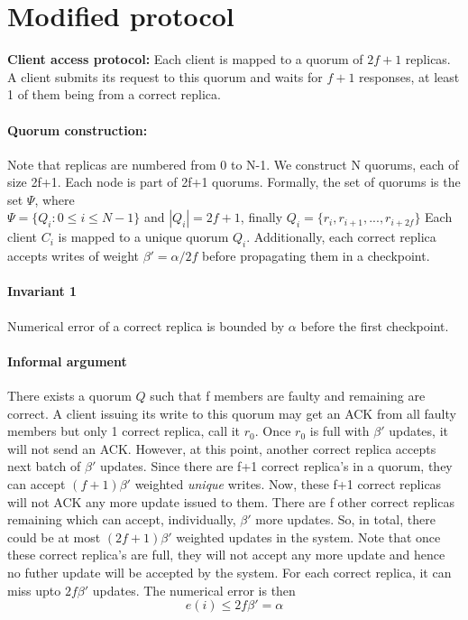 \documentclass[letterpaper,twocolumn,10pt]{article}
\begin{document}
\section{Modified protocol}
\textbf{Client access protocol:} Each client is mapped to a
quorum of $2f+1$ replicas. A client submits its request to
this quorum and waits for $f+1$ responses, at least 1 of 
them being from a correct replica.

\paragraph{Quorum construction:} Note that replicas are numbered
from 0 to N-1. We construct N quorums, each of size 2f+1. Each
node is part of 2f+1 quorums. Formally, the set of quorums is 
the set $\Psi$, where\\
$\Psi = \{Q_{i}:0 \le i \le N-1\}$ and $|Q_{i}| = 2f+1$,
finally $Q_{i}=\{r_{i},r_{i+1},...,r_{i+2f}\}$
Each client $C_{i}$ is mapped to a unique quorum $Q_{i}$.
Additionally, each correct replica accepts writes of 
weight $\beta'=\alpha/2f$ before propagating them in a checkpoint.

\paragraph{Invariant 1} Numerical
error of a correct replica is bounded by $\alpha$ before
the first checkpoint.

\paragraph{Informal argument}
There exists a quorum $Q$ such that f members are faulty
and remaining are correct. A client issuing its write to
this quorum may get an ACK from all faulty members but only
1 correct replica, call it $r_{0}$. Once $r_{0}$ is full
with $\beta'$ updates, it will not send an ACK. However,
at this point, another correct replica accepts next batch
of $\beta'$ updates. Since there are f+1 correct replica's
in a quorum, they can accept $(f+1)\beta'$ weighted 
\textit{unique} writes. Now, these f+1 correct replicas will
not ACK any more update issued to them. There are f other
correct replicas remaining which can accept, individually,
$\beta'$ more updates. So, in total, there could be
at most $(2f+1)\beta'$ weighted updates in the system. Note
that once these correct replica's are full, they will not
accept any more update and hence no futher update will
be accepted by the system. For each correct replica,
it can miss upto $2f\beta'$ updates. The numerical
error is then
\[
e(i) \le 2f\beta' = \alpha
\]
\end{document}

